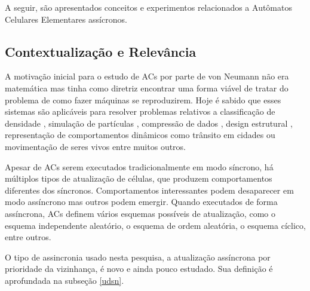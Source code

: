 \documentclass[a4paper,12pt]{ltxdoc}
\newcommand\tab[1][1cm]{\hspace*{#1}}
\begin{document}
\tab A seguir, são apresentados conceitos e experimentos relacionados a Autômatos Celulares Elementares assícronos.

\subsection{Contextualização e Relevância} \label{contex}

A motivação inicial para o estudo de ACs por parte de von Neumann não era matemática mas tinha como diretriz encontrar uma forma viável de tratar do problema de como fazer máquinas se reproduzirem. Hoje é sabido que esses sistemas são aplicáveis para resolver problemas relativos a classificação de densidade \cite{mitchell1994evolving}, simulação de partículas \cite{salem1985thermodynamics}, compressão de dados \cite{lafe1997data}, design estrutural \cite{abdalla2002structural}, representação de comportamentos dinâmicos como trânsito em cidades ou movimentação de seres vivos \cite{rosenblueth2011model} entre muitos outros.

\tab Apesar de ACs serem executados tradicionalmente em modo síncrono, há múltiplos tipos de atualização de células, que produzem comportamentos diferentes dos síncronos. Comportamentos interessantes podem desaparecer em modo assíncrono mas outros podem emergir. 
Quando executados de forma assíncrona, ACs definem vários esquemas possíveis de atualização, como o esquema independente aleatório, o esquema de ordem aleatória, o esquema cíclico, entre outros.

\tab O tipo de assincronia usado nesta pesquisa, a atualização assíncrona por prioridade da vizinhança, é novo e ainda pouco estudado. Sua definição é aprofundada na subseção \ref{udsn}.

%
\end{document}
